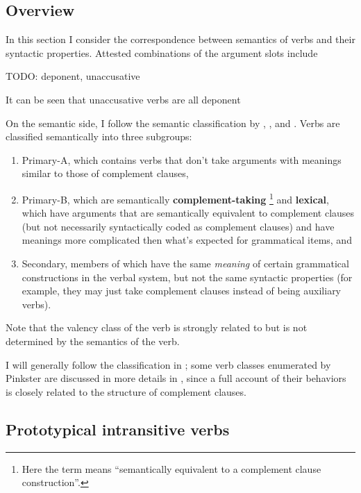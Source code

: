 \documentclass[a4paper, oneside, 12pt]{report}
\newcommand*{\citesec}[1]{\S~{#1}}
\newcommand*{\citechap}[1]{chap.~{#1}}
\newcommand*{\citepages}[1]{pp.~{#1}}
\newcommand*{\concept}[1]{\textbf{#1}}
\begin{document}
\subsection{Overview}\label{sec:verb-phrase.arguments.compatibility}

In this section I consider the correspondence between  
semantics of verbs and their syntactic properties.
Attested combinations of the argument slots include 

TODO: deponent, unaccusative

It can be seen that unaccusative verbs are all deponent
\citep[\citepages{308-309}]{oniga2014latin}

On the semantic side,
I follow the semantic classification by 
\citet[Part B]{dixon2005semantic},
\citet[\citesec{18.5}]{dixon2010basic2},
and \citet[\citesec{3.3}]{dixon2009basic1}.
Verbs are classified semantically into three subgroups:
\begin{enumerate}
    \item Primary-A, which contains verbs that 
    don't take arguments with meanings similar to those of complement clauses,
    \item Primary-B, which are semantically \concept{complement-taking}%
    \footnote{
        Here the term means ``semantically equivalent to a complement clause construction''.
    }
    and \concept{lexical},
    which have arguments that are semantically equivalent to complement clauses 
    (but not necessarily syntactically coded as complement clauses)
    and have meanings more complicated then what's expected for grammatical items, and 
    \item Secondary, members of which have the same \emph{meaning} 
    of certain grammatical constructions in the verbal system,
    but not the same syntactic properties
    (for example, they may just take complement clauses instead of being auxiliary verbs).
\end{enumerate}
Note that the valency class of the verb 
is strongly related to but is not determined by the semantics of the verb.


I will generally follow the classification in \citet[\citechap{4}]{Pinkster1};
some verb classes enumerated by Pinkster are discussed in more details 
in ,
since a full account of their behaviors is closely related to the structure of complement clauses.

\subsection{Prototypical intransitive verbs}\label{sec:prototypical-intransitive}
\end{document}

